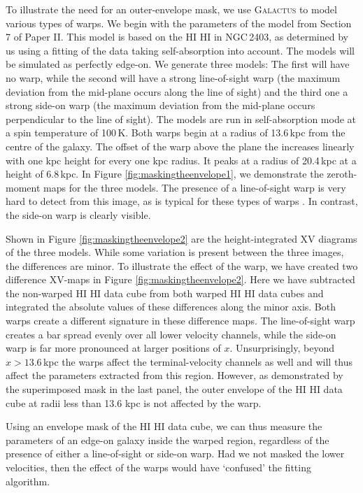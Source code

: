 \documentclass[useAMS,usenatbib]{mn2e}
\newcommand{\hi}{%
  \relax
  \ifmmode
    \textrm{\textsc{HI}}
  \else
    \textsc{H{\smaller}I}
  \fi
}
\begin{document}
To illustrate the need for an outer-envelope mask, we use 
\textsc{Galactus} to model various types of warps.
We begin with the parameters of the model from Section 
7 of Paper II. This model is based on the \hi in NGC\,2403, as
determined by us using a fitting of the data taking self-absorption 
into account. The models will be simulated 
as perfectly edge-on.
We generate three models: The first will have no warp, while 
the second will have a strong line-of-sight warp (the 
maximum deviation from the mid-plane occurs along the line 
of sight) and the third one a strong side-on warp (the maximum 
deviation from the mid-plane occurs 
perpendicular to the line of sight).
The models are run in self-absorption mode at a spin 
temperature of 100\,K.
Both warps begin at a radius of 13.6\,kpc from the centre of the galaxy.
The offset of the warp above the plane the increases 
linearly with one kpc height for every one kpc radius.
It peaks at a radius of 20.4\,kpc at a height of 6.8\,kpc.
In Figure \ref{fig:maskingtheenvelope1}, we demonstrate 
the zeroth-moment maps for the three models.
The presence of a line-of-sight warp is very hard to 
detect from this image, as is typical for these types 
of warps \citep[e.g.][and references therein]{Gentile2003A}. 
In contrast, the side-on warp is clearly visible.

Shown in Figure \ref{fig:maskingtheenvelope2} are 
the height-integrated XV diagrams of the three models.
While some variation is present between the three 
images, the differences are minor.
To illustrate the effect of the warp, we have created 
two difference XV-maps in Figure \ref{fig:maskingtheenvelope2}.
Here we have subtracted the non-warped  \hi data cube from both warped 
 \hi data cubes and 
integrated the absolute values of these differences along the minor axis.
Both warps create a different signature in these difference maps. 
The line-of-sight warp creates a bar spread evenly over all lower 
velocity channels, while the side-on warp is far more pronounced at larger
positions of $x$.
Unsurprisingly, beyond $x>13.6$\,kpc the warps affect the 
terminal-velocity channels as well and will thus affect the parameters 
extracted from this region.
However, as demonstrated by the superimposed mask in the last panel, 
the outer envelope of the  \hi data cube at radii less than 
13.6 kpc is not affected by the warp.

Using an envelope mask of the  \hi data cube, we can thus measure the parameters 
of an edge-on galaxy inside the warped region, regardless of the 
presence of either a line-of-sight or side-on warp. 
Had we not masked the lower velocities, then the effect of the 
warps would have `confused' the fitting algorithm. 
 
\end{document}
